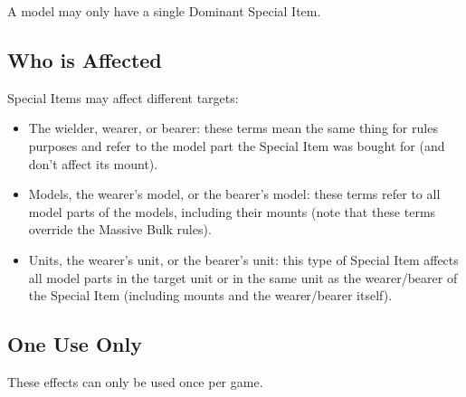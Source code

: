 A model may only have a single Dominant Special Item.

\subsection{Who is Affected}

Special Items may affect different targets:

\begin{itemize}
\item The wielder, wearer, or bearer: these terms mean the same thing for rules purposes and refer to the model part the Special Item was bought for (and don't affect its mount).
\item Models, the wearer's model, or the bearer's model: these terms refer to all model parts of the models, including their mounts (note that these terms override the Massive Bulk rules).
\item Units, the wearer's unit, or the bearer's unit: this type of Special Item affects all model parts in the target unit or in the same unit as the wearer/bearer of the Special Item (including mounts and the wearer/bearer itself).
\end{itemize}

\subsection{One Use Only}
\label{one_use_only}

These effects can only be used once per game.
